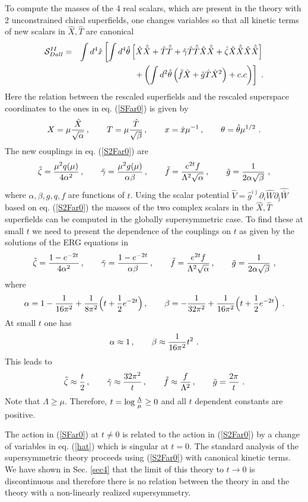 \documentclass[11pt]{article}
\newcommand{\be}{\begin{equation}}
\newcommand{\ee}{\end{equation}}
\newcommand{\bea}{\begin{eqnarray}}
\newcommand{\eea}{\end{eqnarray}}
\newcommand{\rf}[1]{(\ref{#1})}
\def\be{\begin{equation}}
\def\ee{\end{equation}}
\def\bea{\begin{eqnarray}}
\def\eea{\end{eqnarray}}
\newcommand{\lp}{\left(}
\newcommand{\rp}{\right)}
\newcommand{\ls}{\left[}
\newcommand{\rs}{\right]}
\begin{document}
To compute the masses of the 4 real scalars, which are present in the theory with 2 unconstrained chiral superfields, one changes variables so that all kinetic terms of new scalars in $\hat X, \hat T$ are canonical 
\bea
{\cal S}_{Dall}^{II} &=& \int d^4 \hat x\ls\int d^4\hat \theta  \ls  \hat X \hat {\bar X} +   \hat T \hat {\bar T} + \tilde \gamma \hat T \hat {\bar T}  \hat X \hat {\bar X}+  \tilde \zeta \hat X \hat {\bar X}  \hat X \hat {\bar X} \rs \right.\cr
&&\qquad\quad \ \left.+  \lp \int d^2 \hat \theta \lp \tilde f \hat X + \tilde g  \hat T \hat X^2 \rp + c.c\rp\rs \ .
\label{S2Far0}\eea
Here the relation between the rescaled  superfields and the rescaled superspace coordinates to the ones in eq. \rf{SFar0} is given by
 \be
 X= \mu{\hat X\over \sqrt\alpha}\, , \qquad T= \mu{\hat T\over \sqrt\beta}\, , \qquad  x= \hat x \mu^{-1} \, , \qquad  \theta= \hat \theta \mu ^{1/2} \ .
\label{hat} \ee
The new couplings in eq. \rf{S2Far0}  are
 \be
 \tilde \zeta = {\mu^2 q(\mu)\over 4\alpha^2} \, , \qquad \tilde \gamma = {\mu^2 g (\mu) \over \alpha \beta}\, , \qquad \tilde f = {e^{2t}  f\over \Lambda^2 \sqrt\alpha}\, , \qquad\tilde g= {1\over 2\alpha \sqrt \beta} \ ,
\label{par1} \ee 
where $\alpha, \beta, g, q, f$ are functions of $t$. Using the scalar potential $\hat V= \hat g^{i\bar \jmath} \partial_i \hat W \partial_{\bar \jmath}  \hat{ \bar W}$  based on eq. \rf{S2Far0} the masses of the two complex scalars in the $\hat X, \hat T$ superfields can be computed in the globally supersymmetric case. To find these at small $t$ we need to present the dependence of the couplings on $t$ as given by the solutions of the ERG equations in \cite{DallAgata:2022abm}
\be
\tilde \zeta = {1- e^{-2t}\over 4\alpha^2} \, , \qquad \tilde \gamma = {1- e^{-2t} \over \alpha \beta}\, , \qquad \tilde f = {e^{2t}  f\over  \Lambda^2\sqrt\alpha}\, , \qquad\tilde g= {1\over 2\alpha \sqrt \beta} \ ,
\label{par} \ee 
where 
\be
\alpha = 1- {1\over 16 \pi^2} + {1\over 8 \pi^2} \Big (t+ {1\over 2} e^{-2t}\Big)\, , \qquad \beta =  -{1\over 32 \pi^2} + {1\over 16 \pi^2} \Big (t+ {1\over 2} e^{-2t}\Big) \ .
\ee
At small $t$ one has
\be
\alpha \approx  1\, ,\qquad \beta \approx {1\over 16 \pi^2}  t^2 \ .
\label{limb}\ee
This leads to
\be
 \tilde \zeta \approx  {t\over 2} \, ,\qquad  \tilde \gamma \approx  {32 \pi^2\over   t} \, ,\qquad \tilde f \approx   {f \over \Lambda^2 }\, , \qquad\tilde g = {2\pi\over   t} \ .
\ee
Note that $\Lambda \geq \mu$. Therefore, $t = \log {\Lambda \over \mu}\geq 0$ and all $t$ dependent constants are positive.

The action in \rf {SFar0} at $t\neq 0$ is related to the action in \rf{S2Far0} by a change of variables in eq. \rf{hat} which is singular at $t=0$. The standard analysis of the supersymmetric theory proceeds using  \rf{S2Far0} with canonical kinetic terms. We  have shown in Sec. \ref{sec4} that the limit of this theory to $t\to 0$ is discontinuous and therefore there is no relation between the theory in \cite{DallAgata:2022abm} and the theory with a non-linearly realized supersymmetry.




 


\end{document}
